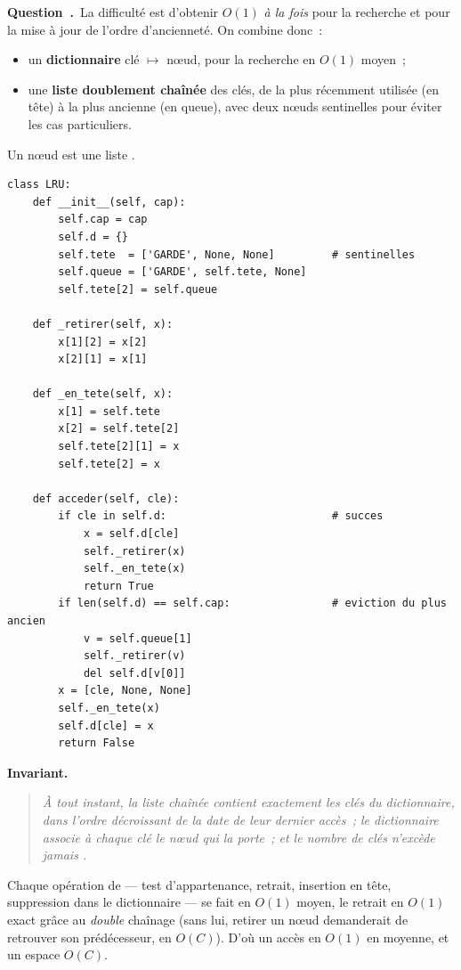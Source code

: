 \documentclass[11pt,a4paper]{article}
\renewcommand{\Q}{\medskip\par\stepcounter{qcnt}\noindent\textbf{\color{cnc}Question~\theqcnt.}~}
\begin{document}
\Q La difficulté est d'obtenir $O(1)$ \emph{à la fois} pour la recherche et pour la mise à
jour de l'ordre d'ancienneté. On combine donc~:
\begin{itemize}[leftmargin=1.4em,itemsep=1pt]
\item un \textbf{dictionnaire} clé $\mapsto$ n\oe ud, pour la recherche en $O(1)$ moyen~;
\item une \textbf{liste doublement chaînée} des clés, de la plus récemment utilisée (en tête)
à la plus ancienne (en queue), avec deux n\oe uds sentinelles pour éviter les cas
particuliers.
\end{itemize}
Un n\oe ud est une liste .
\begin{lstlisting}
class LRU:
    def __init__(self, cap):
        self.cap = cap
        self.d = {}
        self.tete  = ['GARDE', None, None]         # sentinelles
        self.queue = ['GARDE', self.tete, None]
        self.tete[2] = self.queue

    def _retirer(self, x):
        x[1][2] = x[2]
        x[2][1] = x[1]

    def _en_tete(self, x):
        x[1] = self.tete
        x[2] = self.tete[2]
        self.tete[2][1] = x
        self.tete[2] = x

    def acceder(self, cle):
        if cle in self.d:                          # succes
            x = self.d[cle]
            self._retirer(x)
            self._en_tete(x)
            return True
        if len(self.d) == self.cap:                # eviction du plus ancien
            v = self.queue[1]
            self._retirer(v)
            del self.d[v[0]]
        x = [cle, None, None]
        self._en_tete(x)
        self.d[cle] = x
        return False
\end{lstlisting}
\textbf{Invariant.}
\begin{quote}\itshape
À tout instant, la liste chaînée contient exactement les clés du dictionnaire, dans l'ordre
décroissant de la date de leur dernier accès~; le dictionnaire associe à chaque clé le n\oe ud
qui la porte~; et le nombre de clés n'excède jamais .
\end{quote}
Chaque opération de  — test d'appartenance, retrait, insertion en tête,
suppression dans le dictionnaire — se fait en $O(1)$ moyen, le retrait en $O(1)$ exact grâce
au \emph{double} chaînage (sans lui, retirer un n\oe ud demanderait de retrouver son
prédécesseur, en $O(C)$). D'où un accès en $\boxed{O(1)}$ en moyenne, et un espace $O(C)$.
\end{document}
